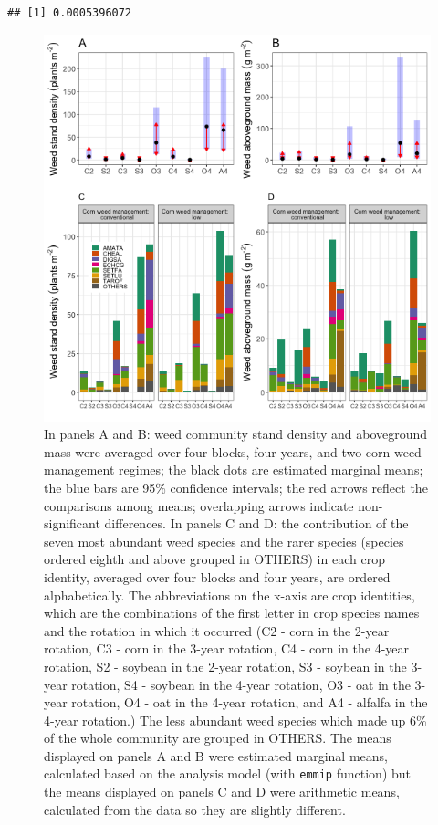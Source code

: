 \documentclass[
]{article}
\begin{document}
\begin{verbatim}
## [1] 0.0005396072
\end{verbatim}

\begin{figure}
\centering
\includegraphics{Community_files/figure-latex/all-sp-dens-biom-1.png}
\caption{\label{fig:all-sp-dens-biom}In panels A and B: weed community stand density and aboveground mass were averaged over four blocks, four years, and two corn weed management regimes; the black dots are estimated marginal means; the blue bars are 95\% confidence intervals; the red arrows reflect the comparisons among means; overlapping arrows indicate non-significant differences. In panels C and D: the contribution of the seven most abundant weed species and the rarer species (species ordered eighth and above grouped in OTHERS) in each crop identity, averaged over four blocks and four years, are ordered alphabetically. The abbreviations on the x-axis are crop identities, which are the combinations of the first letter in crop species names and the rotation in which it occurred (C2 - corn in the 2-year rotation, C3 - corn in the 3-year rotation, C4 - corn in the 4-year rotation, S2 - soybean in the 2-year rotation, S3 - soybean in the 3-year rotation, S4 - soybean in the 4-year rotation, O3 - oat in the 3-year rotation, O4 - oat in the 4-year rotation, and A4 - alfalfa in the 4-year rotation.) The less abundant weed species which made up 6\% of the whole community are grouped in OTHERS. The means displayed on panels A and B were estimated marginal means, calculated based on the analysis model (with \texttt{emmip} function) but the means displayed on panels C and D were arithmetic means, calculated from the data so they are slightly different.}
\end{figure}
\end{document}
